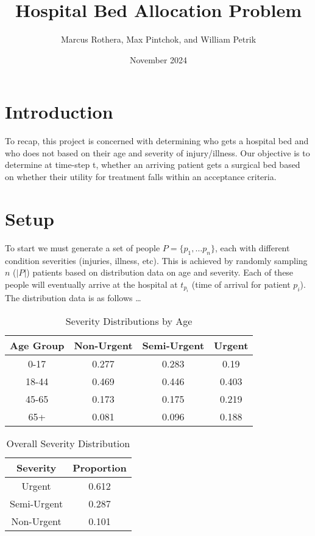 \documentclass{article}
\title{Hospital Bed Allocation Problem}
\author{Marcus Rothera, Max Pintchok, and William Petrik}
\date{November 2024}
\begin{document}
\maketitle

\section{Introduction}
To recap, this project is concerned with determining who gets a hospital bed and who does not based on their age and severity of injury/illness. Our objective is to determine at time-step t, whether an arriving patient gets a surgical bed based on whether their utility for treatment falls within an acceptance criteria.

\section{Setup}
To start we must generate a set of people $P = \{p_1, \dots p_n\}$, each with different condition severities (injuries, illness, etc). This is achieved by randomly sampling $n$ ($|P|$) patients based on distribution data on age and severity. Each of these people will eventually arrive at the hospital at $t_{p_i}$ (time of arrival for patient $p_i$). 
\newline
\newline
The distribution data is as follows \dots
\newline
\begin{table}[h!]
    \centering
    \begin{tabular}{c|c|c|c}
        Age Group & Non-Urgent & Semi-Urgent & Urgent \\
        \midrule
        0-17 & 0.277 & 0.283 & 0.19  \\
        18-44 & 0.469 & 0.446 & 0.403  \\
        45-65 & 0.173 & 0.175 & 0.219 \\
        65+ & 0.081 & 0.096 & 0.188 \\
    \end{tabular}
    \caption{Severity Distributions by Age}
    \label{tab:PB}
\end{table}
\begin{table}[h!]
    \centering
    \begin{tabular}{c|c}
        Severity & Proportion \\
        \midrule
        Urgent & 0.612 \\
        Semi-Urgent & 0.287 \\
        Non-Urgent & 0.101 \\
    \end{tabular}
    \caption{Overall Severity Distribution}
    \label{tab:PB}
\end{table}
\end{document}
